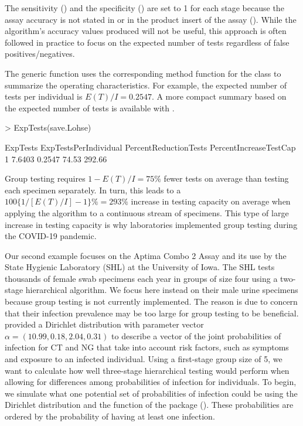 \noindent The sensitivity () and the specificity ()
are set to 1 for each stage because the assay accuracy is not stated
in \citet{lohse2020pooling} or in the product insert of the assay
(\citealt{RealStar}). While the algorithm's accuracy values produced
will not be useful, this approach is often followed in practice to
focus on the expected number of tests regardless of false positives/negatives.

The generic  function uses the corresponding method
function for the class to summarize the operating characteristics.
For example, the expected number of tests per individual is $E(T)/I=0.2547$.
A more compact summary based on the expected number of tests is available
with .

\begin{Schunk}
\begin{Sinput}
> ExpTests(save.Lohse)
\end{Sinput}
\begin{Soutput}
  ExpTests ExpTestsPerIndividual PercentReductionTests PercentIncreaseTestCap
1   7.6403                0.2547                 74.53                 292.66
\end{Soutput}
\end{Schunk}

\noindent Group testing requires $1-E(T)/I=75\%$ fewer tests on average
than testing each specimen separately. In turn, this leads to a $100\{1/[E(T)/I]-1\}\%=293\%$
increase in testing capacity on average when applying the algorithm
to a continuous stream of specimens. This type of large increase in
testing capacity is why laboratories implemented group testing during
the COVID-19 pandemic.

Our second example focuses on the Aptima Combo 2 Assay and its use
by the State Hygienic Laboratory (SHL) at the University of Iowa.
The SHL tests thousands of female swab specimens each year in groups
of size four using a two-stage hierarchical algorithm. We focus here
instead on their male urine specimens because group testing is not
currently implemented. The reason is due to concern that their infection
prevalence may be too large for group testing to be beneficial. \citet{bilder2019informative}
provided a Dirichlet distribution with parameter vector $\alpha=(10.99,0.18,2.04,0.31)$
to describe a vector of the joint probabilities of infection for CT
and NG that take into account risk factors, such as symptoms and exposure
to an infected individual. Using a first-stage group size of 5, we
want to calculate how well three-stage hierarchical testing would
perform when allowing for differences among probabilities of infection
for individuals. To begin, we simulate what one potential set of
probabilities of infection could be using the Dirichlet distribution
and the  function of the 
package (\citealt{rBeta2009}). These probabilities are ordered by
the probability of having at least one infection.

